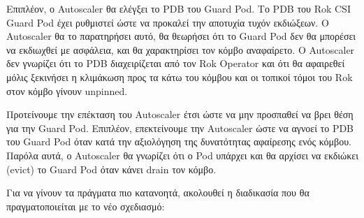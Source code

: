 Επιπλέον, ο Autoscaler θα ελέγξει το PDB του Guard Pod. Το PDB του Rok CSI Guard Pod
έχει ρυθμιστεί ώστε να προκαλεί την αποτυχία τυχόν εκδιώξεων. Ο Autoscaler θα το
παρατηρήσει αυτό, θα θεωρήσει ότι το Guard Pod δεν θα μπορέσει να εκδιωχθεί με
ασφάλεια, και θα χαρακτηρίσει τον κόμβο αναφαίρετο. Ο Autoscaler δεν γνωρίζει ότι το PDB
διαχειρίζεται από τον Rok Operator και ότι θα αφαιρεθεί μόλις ξεκινήσει η
κλιμάκωση προς τα κάτω του κόμβου και οι  τοπικοί τόμοι του Rok  στον κόμβο
γίνουν unpinned.

Προτείνουμε την επέκταση του Autoscaler έτσι ώστε να μην προσπαθεί να βρει θέση για την
Guard Pod. Επιπλέον, επεκτείνουμε την Autoscaler ώστε να αγνοεί το PDB του Guard Pod
όταν κατά την αξιολόγηση της δυνατότητας αφαίρεσης ενός κόμβου. Παρόλα αυτά, ο
Autoscaler θα γνωρίζει ότι ο Pod υπάρχει και θα αρχίσει να εκδιώκει (evict) το Guard Pod
όταν κάνει drain τον κόμβο.

Για να γίνουν τα πράγματα πιο κατανοητά, ακολουθεί η διαδικασία που θα
πραγματοποιείται με το νέο σχεδιασμό:

